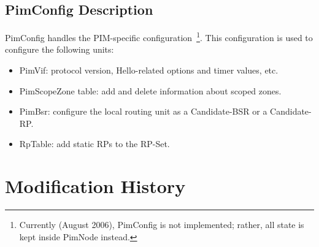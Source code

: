 \documentclass[11pt]{article}
\begin{document}
\subsection{PimConfig Description}

PimConfig handles the PIM-specific configuration~\footnote{Currently
(August 2006), PimConfig is not implemented; rather, all state is
kept inside PimNode instead.}. This configuration is used to configure the
following units:

\begin{itemize}

  \item PimVif: protocol version, Hello-related options and timer
  values, etc.

  \item PimScopeZone table: add and delete information about scoped zones.

  \item PimBsr: configure the local routing unit as a Candidate-BSR or a
  Candidate-RP.

  \item RpTable: add static RPs to the RP-Set.

\end{itemize}

\appendix
\section{Modification History}
\end{document}
